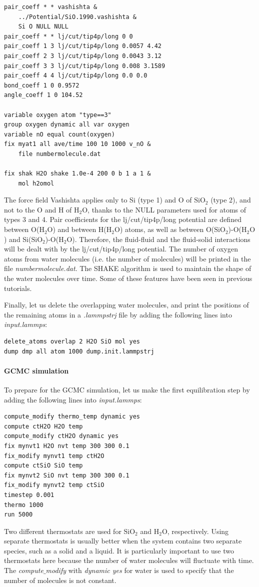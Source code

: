 \documentclass[9pt,tutorial]{livecoms}
\begin{document}
{\normalsize \begin{verbatim}
pair_coeff * * vashishta & 
    ../Potential/SiO.1990.vashishta &
    Si O NULL NULL
pair_coeff * * lj/cut/tip4p/long 0 0
pair_coeff 1 3 lj/cut/tip4p/long 0.0057 4.42
pair_coeff 2 3 lj/cut/tip4p/long 0.0043 3.12
pair_coeff 3 3 lj/cut/tip4p/long 0.008 3.1589
pair_coeff 4 4 lj/cut/tip4p/long 0.0 0.0
bond_coeff 1 0 0.9572
angle_coeff 1 0 104.52

variable oxygen atom "type==3"
group oxygen dynamic all var oxygen
variable nO equal count(oxygen)
fix myat1 all ave/time 100 10 1000 v_nO &
    file numbermolecule.dat

fix shak H2O shake 1.0e-4 200 0 b 1 a 1 &
    mol h2omol
\end{verbatim}}
The force field Vashishta applies only to Si (type 1) and O of $\text{SiO}_2$ (type 2), and not to the O and H of $\text{H}_2\text{O}$, thanks to the NULL parameters used for atoms of types 3 and 4. Pair coefficients for the lj/cut/tip4p/long potential are defined between O($\text{H}_2\text{O}$) and between H($\text{H}_2\text{O}$) atoms, as well as between O($\text{SiO}_2$)-O($\text{H}_2\text{O}$) and Si($\text{SiO}_2$)-O($\text{H}_2\text{O}$). Therefore, the fluid-fluid and the fluid-solid interactions will be dealt with by the lj/cut/tip4p/long potential. The number of oxygen atoms from water molecules (i.e. the number of molecules) will be printed in the file \textit{numbermolecule.dat}. The SHAKE algorithm is used to maintain the shape of the water molecules over time. Some of
these features have been seen in previous tutorials. 

Finally, let us delete the overlapping water molecules, and print the
positions of the remaining atoms in a \textit{.lammpstrj} file by adding the following lines into \textit{input.lammps}:
{\normalsize \begin{verbatim}
delete_atoms overlap 2 H2O SiO mol yes
dump dmp all atom 1000 dump.init.lammpstrj
\end{verbatim}}

\paragraph{GCMC simulation}
To prepare for the GCMC simulation, let us make the first equilibration step by adding the following lines into \textit{input.lammps}:
{\normalsize \begin{verbatim}
compute_modify thermo_temp dynamic yes
compute ctH2O H2O temp
compute_modify ctH2O dynamic yes
fix mynvt1 H2O nvt temp 300 300 0.1
fix_modify mynvt1 temp ctH2O
compute ctSiO SiO temp
fix mynvt2 SiO nvt temp 300 300 0.1
fix_modify mynvt2 temp ctSiO
timestep 0.001
thermo 1000
run 5000
\end{verbatim}}
Two different thermostats are used for $\text{SiO}_2$ and $\text{H}_2\text{O}$, respectively. Using separate thermostats is usually better when the system contains two separate species, such as a solid and a liquid. It is particularly important to use two thermostats
here because the number of water molecules will fluctuate with time. The \textit{compute$\_$modify} with 
\textit{dynamic yes} for water is used to specify that the number of molecules is not constant. 
\end{document}
